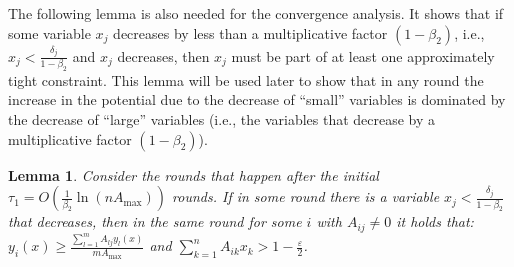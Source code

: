 \documentclass[11pt]{article}
\newtheorem{lemma}[theorem]{Lemma}
\newif\iffullpaper
\begin{document}
The following lemma is also needed for the convergence analysis. It shows that if some variable $x_j$  decreases by less than a multiplicative factor $(1-\beta_2)$, i.e., $x_j<\frac{\delta_j}{1-\beta_2}$ and $x_j$ decreases, then $x_j$ must be part of at least one approximately tight constraint. This lemma will be used later to show that in any round the increase in the potential due to the decrease of ``small'' variables is dominated by the decrease of ``large'' variables (i.e., the variables that decrease by a multiplicative factor $(1-\beta_2)$). 

\begin{lemma}\label{lemma:small-x-tight-yi}
Consider the rounds that happen after the initial $\tau_1 = O(\frac{1}{\beta_2}\ln(nA_{\max}))$ rounds. If in some round there is  a variable $x_j<\frac{\delta_j}{1-\beta_2}$ that decreases, then in the same round for some $i$ with $A_{ij} \neq 0$ it holds that: $y_i(x) \geq \frac{\sum_{l=1}^m A_{lj}y_l(x)}{mA_{\max}}$ and $\sum_{k=1}^n A_{ik}x_k > 1 - \frac{\varepsilon}{2}$.
\end{lemma}
\iffullpaper
\end{document}
